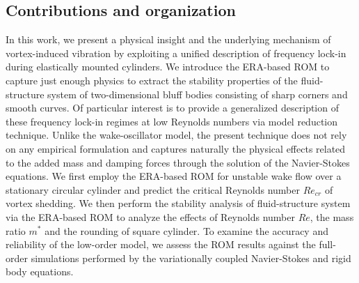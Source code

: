 \documentclass{jfm}
\begin{document}
\subsection{Contributions and organization}
In this work, we present a physical insight and the 
underlying mechanism of vortex-induced vibration 
by exploiting a unified description of frequency lock-in during elastically mounted cylinders. 
We introduce the ERA-based ROM  to capture just enough physics 
to extract the stability properties of the fluid-structure system
of two-dimensional bluff bodies consisting of sharp corners and smooth curves. 
%
Of particular interest is to provide a generalized description 
of these frequency lock-in regimes at low Reynolds numbers via model reduction technique. 
Unlike the wake-oscillator model, the present technique does not rely on any empirical formulation and captures naturally the physical effects related to the 
added mass and damping forces through the solution of the Navier-Stokes equations.
We first employ the ERA-based ROM for unstable wake flow over a stationary circular cylinder 
and predict the critical Reynolds number $Re_{cr}$ of vortex shedding. 
We then perform the stability analysis of fluid-structure system via the ERA-based ROM to analyze
the effects of Reynolds number $Re$, the mass ratio $m^*$ and the rounding of square cylinder.
To examine the accuracy and reliability of the low-order model, we assess the ROM results 
against the full-order simulations 
performed by the variationally coupled Navier-Stokes and rigid body equations.
\end{document}
